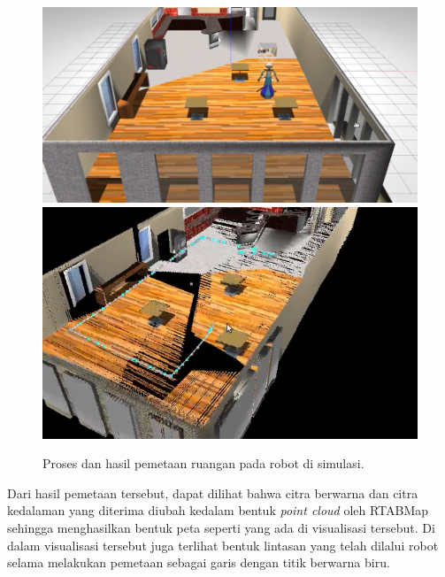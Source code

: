\begin{figure}[ht]
  \centering
  \includegraphics[height=0.26\textwidth,keepaspectratio]{gambar/proses-pemetaan.png}
  \includegraphics[height=0.26\textwidth,keepaspectratio]{gambar/hasil-pemetaan.png}
  \caption{Proses dan hasil pemetaan ruangan pada robot di simulasi.}
  \label{fig:hasilpemetaan}
\end{figure}

Dari hasil pemetaan tersebut,
  dapat dilihat bahwa citra berwarna dan citra kedalaman yang diterima diubah kedalam bentuk \emph{point cloud} oleh RTABMap sehingga menghasilkan bentuk peta seperti yang ada di visualisasi tersebut.
Di dalam visualisasi tersebut juga terlihat bentuk lintasan yang telah dilalui robot selama melakukan pemetaan sebagai garis dengan titik berwarna biru.
